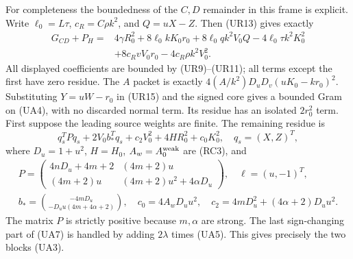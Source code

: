 For completeness the boundedness of the $C,D$ remainder in this frame
is explicit. Write $\ell_0=L\tau$, $c_R=C\rho k^2$, and
$Q=uX-Z$. Then (UR13) gives exactly
\begin{align*}
 G_{CD}+P_H={}&4\gamma R_0^2
 +8\ell_0kK_0r_0+8\ell_0qk^2V_0Q-4\ell_0\tau k^2K_0^2\\
 &+8c_RvV_0r_0-4c_R\rho k^2V_0^2.                  \tag{UA6}
\end{align*}
All displayed coefficients are bounded by (UR9)--(UR11); all terms
except the first have zero residue. The $A$ packet is exactly
$4(A/k^2)D_uD_v(uK_0-kr_0)^2$. Substituting
$Y=uW-r_0$ in (UR15) and the signed core gives a bounded Gram on
(UA4), with no discarded normal term. Its residue has an isolated
$2r_0^2$ term. First suppose the leading source weights are finite.
The remaining residue is
\[
 q_s^TPq_s+2V_0b_*^Tq_s+c_2V_0^2+4H R_0^2+c_0K_0^2,
 \quad q_s=(X,Z)^T,                                  \tag{UA7}
\]
where $D_u=1+u^2$, $H=H_0$, $A_w=A_0^{\rm weak}$ are (RC3), and
\[
\begin{gathered}
 P=\begin{pmatrix}
 4nD_u+4m+2&(4m+2)u\\
 (4m+2)u&(4m+2)u^2+4\alpha D_u
 \end{pmatrix},\quad \ell=(u,-1)^T,\\
 b_*=\binom{-4mD_u}{-D_uu(4m+4\alpha+2)},\quad
 c_0=4A_wD_uu^2,\quad
 c_2=4mD_u^2+(4\alpha+2)D_uu^2.                      
\end{gathered}
\tag{UA8}
\]
The matrix $P$ is strictly positive because $m,\alpha$ are strong.
The last sign-changing part of (UA7) is handled by adding
$2\lambda$ times (UA5). This gives precisely the two blocks (UA3).

